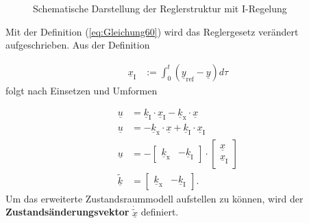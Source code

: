 \begin{figure}[H]
    \centering
    \caption[Reglerstruktur I-Regelung]{Schematische Darstellung der Reglerstruktur mit I-Regelung}
    \label{fig:Bild11}
\end{figure}

Mit der Definition (\autoref{eq:Gleichung60}) wird das Reglergesetz verändert aufgeschrieben. Aus der Definition

\begin{align}\label{eq:Gleichung60}
    \underline{x}_{\mathrm{I}}& :=\int_{0}^t(\underline{y}_{\mathrm{ref}}-\underline{y})d\tau
\end{align}
\newline
folgt nach Einsetzen und Umformen

\begin{align}
    \underline{u} &= \underline{k}_{\mathrm{I}}\cdot\underline{x}_{\mathrm{I}}-\underline{k}_{\mathrm{x}}\cdot\underline{x} \nonumber \\
    \underline{u} &= -\underline{k}_{\mathrm{x}}\cdot\underline{x}+\underline{k}_{\mathrm{I}}\cdot\underline{x}_{\mathrm{I}} \nonumber\\
    \underline{u} &= -
    \begin{bmatrix}
        \underline{k}_{\mathrm{x}} & -\underline{k}_{\mathrm{I}}
    \end{bmatrix}
    \cdot
    \begin{bmatrix}
        \underline{x} \\
        \underline{x}_{\mathrm{I}}
    \end{bmatrix} \label{eq:Gleichung61} \\
    \underline{\tilde{k}} &= 
    \begin{bmatrix}
        \underline{k}_{\mathrm{x}} & -\underline{k}_{\mathrm{I}}
    \end{bmatrix}. \label{eq:Gleichung62}
\end{align}
\newline
Um das erweiterte Zustandsraummodell aufstellen zu können, wird der \textbf{Zustandsänderungsvektor} $\underline{\dot{\tilde{x}}}$ definiert.

